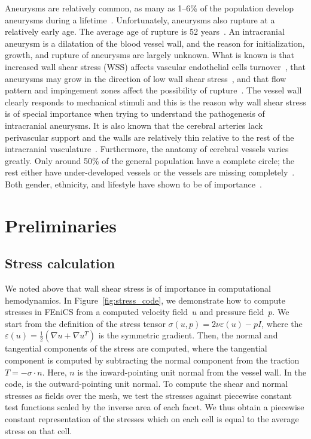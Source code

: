 Aneurysms are relatively common, as many as 1--6\% of the population
develop aneurysms during a lifetime~\cite{Weir2002}. Unfortunately,
aneurysms also rupture at a relatively early age. The average age of
rupture is 52 years~\cite{Humphrey2001}. An intracranial aneurysm is a
dilatation of the blood vessel wall, and the reason for
initialization, growth, and rupture of aneurysms are largely unknown.
What is known is that increased wall shear stress (WSS) affects
vascular endothelial cells turnover~\cite{DAVIESREMUZZIGORDONEtAl1986}, that aneurysms may
grow in the direction of low wall shear stress~\cite{BousselRayzMcCullochEtAl2008}, and
that flow pattern and impingement zones affect the possibility of
rupture~\cite{CebralCastroBurgessEtAl2005}. The vessel wall clearly responds to mechanical
stimuli and this is the reason why wall shear stress is of special
importance when trying to understand the pathogenesis of intracranial
aneurysms. It is also known that the cerebral arteries lack
perivascular support and the walls are relatively thin relative to the
rest of the intracranial vasculature~\cite{Humphrey2001,Stehbens}.
Furthermore, the anatomy of cerebral vessels varies greatly. Only
around 50\% of the general population have a complete circle; the rest
either have under-developed vessels or the vessels are missing
completely~\cite{Fung1984}. Both gender, ethnicity, and lifestyle have
shown to be of importance~\cite{MhurchuAndersonJamrozikEtAl2001,Longstreth,Kongable}.

\section{Preliminaries}

\subsection{Stress calculation}

We noted above that wall shear stress is of importance in
computational hemodynamics. In Figure~\ref{fig:stress_code}, we
demonstrate how to compute stresses in FEniCS from a computed velocity
field~$u$ and pressure field~$p$. We start from the definition of the
stress tensor $\sigma(u,p) = 2 \nu \varepsilon (u) - p I$, where the
$\varepsilon(u) = \frac{1}{2}(\nabla u + \nabla u^T)$ is the symmetric
gradient. Then, the normal and tangential components of the stress are
computed, where the tangential component is computed by subtracting
the normal component from the traction $T = -\sigma \cdot n$. Here,
$n$ is the inward-pointing unit normal from the vessel wall. In the
code,  is the outward-pointing unit normal. To compute the
shear and normal stresses as fields over the mesh, we test the
stresses against piecewise constant test functions scaled by the
inverse area of each facet. We thus obtain a piecewise constant
representation of the stresses which on each cell is equal to the
average stress on that cell.

